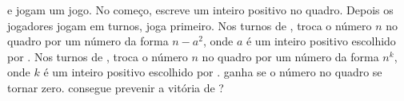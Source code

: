  e  jogam um jogo. 
No começo,  escreve um inteiro positivo no quadro.
Depois os jogadores jogam em turnos,  joga primeiro.
Nos turnos de ,  troca o número $n$ no quadro por um número da forma $n−a^2$, onde $a$ é um inteiro positivo escolhido por .
Nos turnos de ,  troca o número $n$ no quadro por um número da forma $n^k$, onde $k$ é um inteiro positivo escolhido por .
 ganha se o número no quadro se tornar zero.  consegue prevenir a vitória de ?